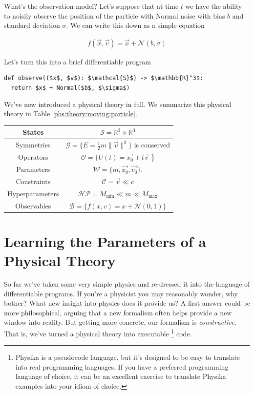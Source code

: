 \documentclass[book.tex]{subfiles}
\begin{document}
What's the observation model? Let's suppose that at time $t$ we have the ability to noisily observe the position of the particle with Normal noise with bias $b$ and standard deviation $\sigma$. We can write this down as a simple equation

\begin{align}
f(\vec{x}, \vec{v}) = \vec{x} + \mathcal{N}(b, \sigma)
\end{align}

Let's turn this into a brief differentiable program

\begin{lstlisting}
def observe(($x$, $v$): $\mathcal{S}$) -> $\mathbb{R}^3$:
  return $x$ + Normal($b$, $\sigma$)
\end{lstlisting}

We've now introduced a physical theory in full. We summarize this physical theory in Table \ref{phs:theory:moving:particle}.

\begin{center}
\begin{tabular}{|c|c|}
    \hline
    States & $\mathcal{S} = \mathbb{R}^3 \times \mathbb{R}^3$ \\
    \hline
    Symmetries & $\mathcal{G} = \{E = \frac{1}{2}m\|\vec{v}\|^2\}$ is conserved \\
    \hline
    Operators & $\mathcal{O} = \{U(t) = \vec{x_0} + t \vec{v}$ \}\\
    \hline
    Parameters & $\mathcal{W} = \{m, \vec{x_0}, \vec{v_0}\}$. \\
    \hline
    Constraints & $\mathcal{C} = \vec{v} \ll c$ \\
    \hline
    Hyperparameters & $\mathcal{HP} = {M_{\textrm{min}} \ll m \ll M_{\textrm{max}}}$  \\
    \hline
    Observables & $\mathcal{B} = \{f(x, v) = x + \mathcal{N}(0, 1) \}$  \\
    \hline
\end{tabular}
\label{phs:theory:moving:particle}
\end{center}

\section{Learning the Parameters of a Physical Theory}

So far we've taken some very simple physics and re-dressed it into the language of differentiable programs. If you're a physicist you may reasonably wonder, why bother? What new insight into physics does it provide us? A first answer could be more philosophical, arguing that a new formalism often helps provide a new window into reality. But getting more concrete, our formalism is \textit{constructive}. That is, we've turned a physical theory into executable \footnote{Physika is a pseudocode language, but it's designed to be easy to translate into real programming languages. If you have a preferred programming language of choice, it can be an excellent exercise to translate Physika examples into your idiom of choice.} code.
\end{document}
